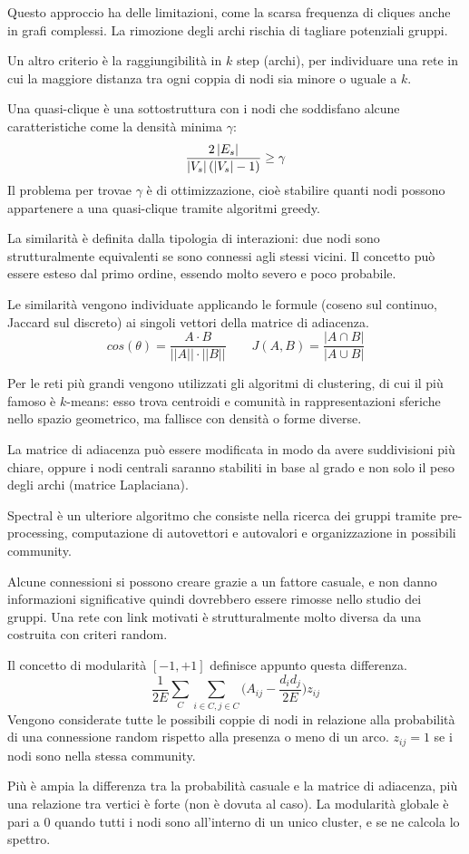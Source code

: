 Questo approccio ha delle limitazioni, come la scarsa frequenza di cliques anche in grafi complessi. La rimozione degli archi rischia di tagliare potenziali gruppi. 

Un altro criterio è la raggiungibilità in $k$ step (archi), per individuare una rete in cui la maggiore distanza tra ogni coppia di nodi sia minore o uguale a $k$. 

Una quasi-clique è una sottostruttura con i nodi che soddisfano alcune caratteristiche come la densità minima $\gamma$:
$$\frac{2\left|E_s\right|}{\left|V_s\right|(\left|V_s\right| - 1)} \geq \gamma$$
Il problema per trovae $\gamma$ è di ottimizzazione, cioè stabilire quanti nodi possono appartenere a una quasi-clique tramite algoritmi greedy.

La similarità è definita dalla tipologia di interazioni: due nodi sono strutturalmente equivalenti se sono connessi agli stessi vicini. Il concetto può essere esteso dal primo ordine, essendo molto severo e poco probabile. 

Le similarità vengono individuate applicando le formule (coseno sul continuo, Jaccard sul discreto) ai singoli vettori della matrice di adiacenza. 
$$cos(\theta) = \frac{A \cdot B}{||A|| \cdot ||B||} \qquad J(A, B) = \frac{|A \cap B|}{|A \cup B|}$$

Per le reti più grandi vengono utilizzati gli algoritmi di clustering, di cui il più famoso è $k$-means: esso trova centroidi e comunità in rappresentazioni sferiche nello spazio geometrico, ma fallisce con densità o forme diverse. 

La matrice di adiacenza può essere modificata in modo da avere suddivisioni più chiare, oppure i nodi centrali saranno stabiliti in base al grado e non solo il peso degli archi (matrice Laplaciana).

Spectral è un ulteriore algoritmo che consiste nella ricerca dei gruppi tramite pre-processing, computazione di autovettori e autovalori e organizzazione in possibili community. 

Alcune connessioni si possono creare grazie a un fattore casuale, e non danno informazioni significative quindi dovrebbero essere rimosse nello studio dei gruppi. Una rete con link motivati è strutturalmente molto diversa da una costruita con criteri random.

Il concetto di modularità $[-1, +1]$  definisce appunto questa differenza. 
$$\frac{1}{2E} \sum_{C} \sum_{i \in C, j \in C} \Big(A_{ij} - \frac{d_id_j}{2E}\Big) z_{ij}$$
Vengono considerate tutte le possibili coppie di nodi in relazione alla probabilità di una connessione random rispetto alla presenza o meno di un arco. $z_{ij} = 1$ se i nodi sono nella stessa community.

Più è ampia la differenza tra la probabilità casuale e la matrice di adiacenza, più una relazione tra vertici è forte (non è dovuta al caso). La modularità globale è pari a 0 quando tutti i nodi sono all'interno di un unico cluster, e se ne calcola lo spettro. 








